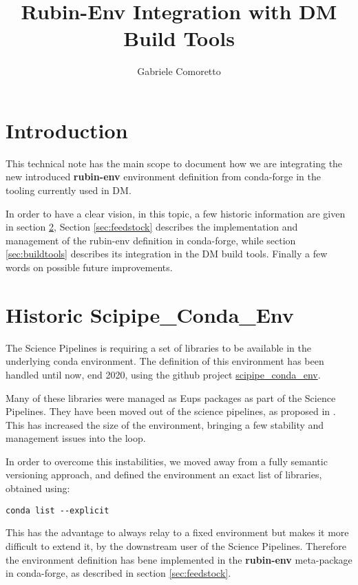 \documentclass[DM,authoryear,toc]{lsstdoc}
\title{Rubin-Env Integration with DM Build Tools}
\author{%
Gabriele Comoretto
}
\date{\vcsDate}
\begin{document}
\maketitle


\section{Introduction} \label{sec:intro}

This technical note has the main scope to document how we are integrating the new introduced 
\textbf{rubin-env} environment definition from conda-forge in the tooling currently used in DM.

In order to have a clear vision, in this topic, a few historic information are given in section \ref{sec:history},
Section \ref{sec:feedstock} describes the implementation and management of the rubin-env definition in conda-forge,
while section \ref{sec:buildtools} describes its integration in the DM build tools. Finally a few words on possible future improvements.


\section{Historic Scipipe\_Conda\_Env} \label{sec:history}

The Science Pipelines is requiring a set of libraries to be available in the underlying conda environment.
The definition of this environment has been handled until now, end 2020, using the github project 
\href{https://github.com/lsst/scipipe_conda_env}{scipipe\_conda\_env}.

Many of these libraries were managed as Eups packages as part of the Science Pipelines. 
They have been moved out of the science pipelines, as proposed in .
This has increased the size of the environment, bringing a few stability and management issues into the loop.

In order to overcome this instabilities, we moved away from a fully semantic versioning approach,
and defined the environment an exact list of libraries, obtained using:

\begin{verbatim}
conda list --explicit
\end{verbatim}

This has the advantage to always relay to a fixed environment but makes it more difficult to extend it,
by the downstream user of the Science Pipelines.
Therefore the environment definition has bene implemented in the \textbf{rubin-env} meta-package in conda-forge, 
as described in section \ref{sec:feedstock}.
\end{document}
